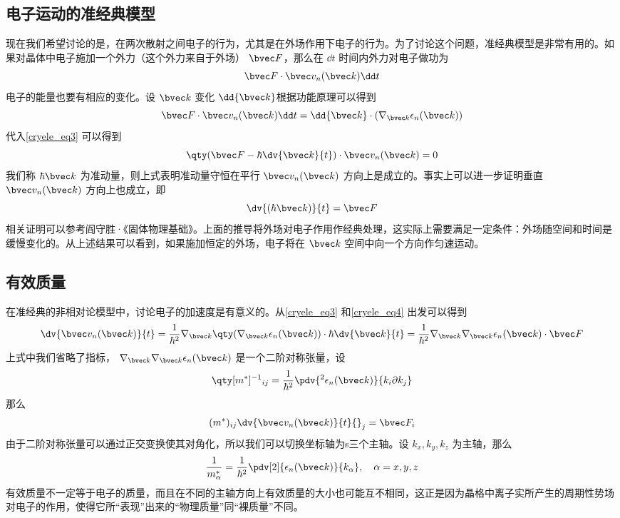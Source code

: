\subsection{电子运动的准经典模型}
现在我们希望讨论的是，在两次散射之间电子的行为，尤其是在外场作用下电子的行为。为了讨论这个问题，准经典模型是非常有用的。如果对晶体中电子施加一个外力（这个外力来自于外场） $\bvec F$，那么在 $\dd t$ 时间内外力对电子做功为
\begin{equation}
\bvec F\cdot \bvec v_n(\bvec k)\dd t
\end{equation}
电子的能量也要有相应的变化。设 $\bvec k$ 变化 $\dd{\bvec k}$根据功能原理可以得到
\begin{equation}
\bvec F\cdot \bvec v_n(\bvec k)\dd t
=\dd {\bvec k}\cdot (\nabla_{\bvec k}\epsilon_n(\bvec k))
\end{equation}
代入\autoref{cryele_eq3} 可以得到
\begin{equation}
\qty(\bvec F-\hbar\dv{\bvec k}{t})\cdot \bvec v_n(\bvec k)=0
\end{equation}
我们称 $\hbar \bvec k$ 为准动量，则上式表明准动量守恒在平行 $\bvec v_n(\bvec k)$ 方向上是成立的。事实上可以进一步证明垂直 $\bvec v_n(\bvec k)$ 方向上也成立，即
\begin{equation}\label{cryele_eq4}
\dv{(\hbar \bvec k)}{t}=\bvec F
\end{equation}
相关证明可以参考阎守胜·《固体物理基础》\cite{阎守胜}。上面的推导将外场对电子作用作经典处理，这实际上需要满足一定条件：外场随空间和时间是缓慢变化的。从上述结果可以看到，如果施加恒定的外场，电子将在 $\bvec k$ 空间中向一个方向作匀速运动。
\subsection{有效质量}
在准经典的非相对论模型中，讨论电子的加速度是有意义的。从\autoref{cryele_eq3} 和\autoref{cryele_eq4} 出发可以得到
\begin{equation}
\dv{\bvec v_n(\bvec k)}{t}=\frac{1}{\hbar^2}\nabla_{\bvec k}\qty(\nabla_{\bvec k}\epsilon_n(\bvec k) )\cdot \hbar\dv{\bvec k}{t}=\frac{1}{\hbar^2}\nabla_{\bvec k}\nabla_{\bvec k}\epsilon_n(\bvec k) \cdot \bvec F
\end{equation}
上式中我们省略了指标， $\nabla_{\bvec k}\nabla_{\bvec k}\epsilon_n(\bvec k)$ 是一个二阶对称张量，设
\begin{equation}
\qty[m^{*}]^{-1}{}_{ij}=\frac{1}{\hbar^2}\pdv{{}^2\epsilon_n(\bvec k)}{k_i\partial k_j} 
\end{equation}
那么
\begin{equation}
(m^*)_{ij}\dv{\bvec v_n(\bvec k)}{t}{}_j=\bvec F_i
\end{equation}
由于二阶对称张量可以通过正交变换使其对角化，所以我们可以切换坐标轴为s三个主轴。设 $k_x,k_y,k_z$ 为主轴，那么
\begin{equation}\label{cryele_eq5}
\frac{1}{m_\alpha^*}=\frac{1}{\hbar^2}\pdv[2]{\epsilon_n(\bvec k)}{k_\alpha},\quad \alpha=x,y,z
\end{equation}
有效质量不一定等于电子的质量，而且在不同的主轴方向上有效质量的大小也可能互不相同，这正是因为晶格中离子实所产生的周期性势场对电子的作用，使得它所“表现”出来的“物理质量”同“裸质量”不同。

